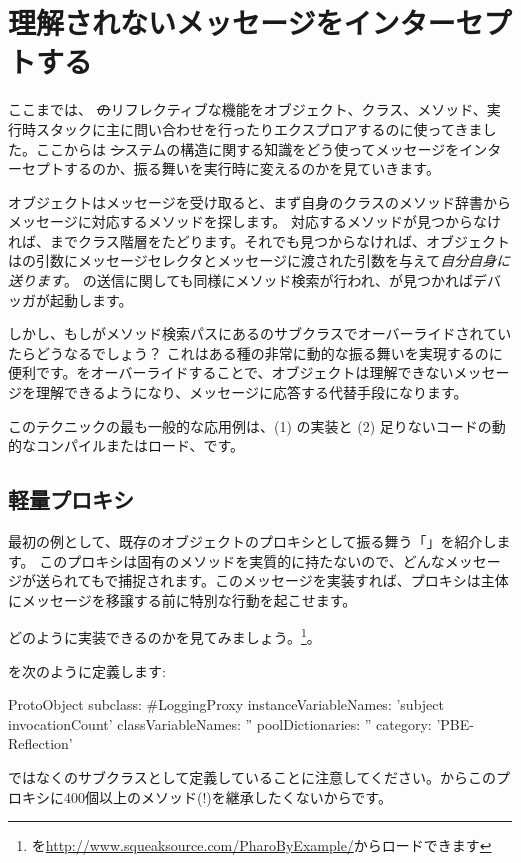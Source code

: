 \documentclass[a4paper,10pt,twoside]{book}
\begin{document}
\section{理解されないメッセージをインターセプトする}

ここまでは、 \st のリフレクティブな機能をオブジェクト、クラス、メソッド、実行時スタックに主に問い合わせを行ったりエクスプロアするのに使ってきました。ここからは \st システムの構造に関する知識をどう使ってメッセージをインターセプトするのか、振る舞いを実行時に変えるのかを見ていきます。

オブジェクトはメッセージを受け取ると、まず自身のクラスのメソッド辞書からメッセージに対応するメソッドを探します。
対応するメソッドが見つからなければ、までクラス階層をたどります。それでも見つからなければ、オブジェクトはの引数にメッセージセレクタとメッセージに渡された引数を与えて\emph{自分自身に送ります}。
の送信に関しても同様にメソッド検索が行われ、が見つかればデバッガが起動します。

しかし、もしがメソッド検索パスにあるのサブクラスでオーバーライドされていたらどうなるでしょう？
これはある種の非常に動的な振る舞いを実現するのに便利です。をオーバーライドすることで、オブジェクトは理解できないメッセージを理解できるようになり、メッセージに応答する代替手段になります。

このテクニックの最も一般的な応用例は、(1) の実装と (2) 足りないコードの動的なコンパイルまたはロード、です。

\subsection{軽量プロキシ}

最初の例として、既存のオブジェクトのプロキシとして振る舞う「」を紹介します。
このプロキシは固有のメソッドを実質的に持たないので、どんなメッセージが送られてもで捕捉されます。このメッセージを実装すれば、プロキシは主体にメッセージを移譲する前に特別な行動を起こせます。

どのように実装できるのかを見てみましょう。\footnote{を\url{http://www.squeaksource.com/PharoByExample/}からロードできます}。

を次のように定義します:
\begin{code}{}
ProtoObject subclass: #LoggingProxy
	instanceVariableNames: 'subject invocationCount'
	classVariableNames: ''
	poolDictionaries: ''
	category: 'PBE-Reflection'
\end{code}
ではなくのサブクラスとして定義していることに注意してください。からこのプロキシに400個以上のメソッド(!)を継承したくないからです。
\end{document}
